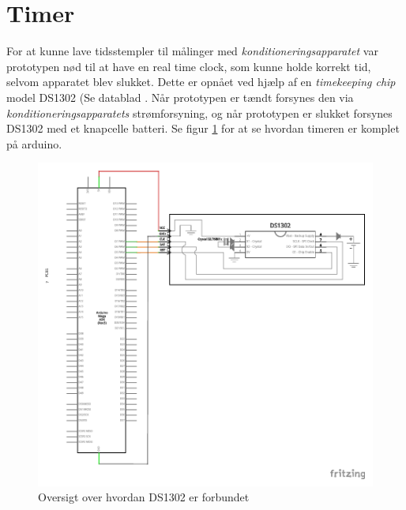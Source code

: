 \section{Timer}
For at kunne lave tidsstempler til målinger med \textit{konditioneringsapparatet} var prototypen nød til at have en real time clock, som kunne holde korrekt tid, selvom apparatet blev slukket. Dette er opnået ved hjælp af en \textit{timekeeping chip} model DS1302 (Se datablad \cite{Manual:2}. Når prototypen er tændt forsynes den via \textit{konditioneringsapparatets} strømforsyning, og når prototypen er slukket forsynes DS1302 med et knapcelle batteri. Se figur \ref{fig:timerschematic} for at se hvordan timeren er komplet på arduino. 
\begin{figure}[H]
	\includegraphics[trim = 15 30 0 0, clip = true, width = \textwidth]{Implementeringsdokument/billeder/Timer_schem.pdf}
	\caption{Oversigt over hvordan DS1302 er forbundet}\label{fig:timerschematic}
\end{figure}

